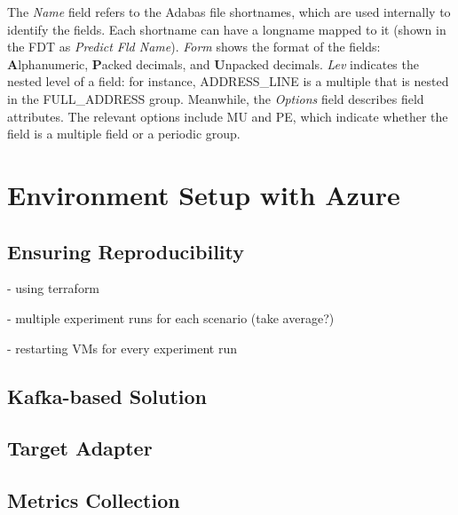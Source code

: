 The \textit{Name} field refers to the Adabas file shortnames, which are used internally to identify the fields. Each shortname can have a longname mapped to it (shown in the \ac{FDT} as \textit{Predict Fld Name}). \textit{Form} shows the format of the fields: \textbf{A}lphanumeric, \textbf{P}acked decimals, and \textbf{U}npacked decimals. \textit{Lev} indicates the nested level of a field: for instance, ADDRESS\_LINE is a multiple that is nested in the FULL\_ADDRESS group. Meanwhile, the \textit{Options} field describes field attributes. The relevant options include MU and PE, which indicate whether the field is a multiple field or a periodic group.

\section{Environment Setup with Azure}
\label{ch05:methodology:environmentsetup}

\subsection{Ensuring Reproducibility}
- using terraform

- multiple experiment runs for each scenario (take average?)

- restarting VMs for every experiment run


\subsection{Kafka-based Solution}

\subsection{Target Adapter}

\subsection{Metrics Collection}